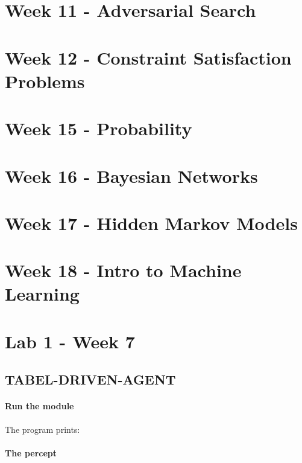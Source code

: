 \documentclass{article}
\begin{document}
\section{Week 11 - Adversarial Search}%
\label{sub:_adversarial_search}


\newpage
\section{Week 12 - Constraint Satisfaction Problems}%
\label{sec:23_march_constraint_satisfaction_problems}



\newpage
\section{Week 15 - Probability}%
\label{sec:12_march_probability}

\newpage
\section{Week 16 - Bayesian Networks}%
\label{sec:20_march_bayesian_networks}

\newpage
\section{Week 17 - Hidden Markov Models}%
\label{sec:27_march_hidden_markov_models}

\newpage
\section{Week 18 - Intro to Machine Learning}%
\label{sec:}

\newpage
\section{Lab 1 - Week 7}%
\label{sec:lab_week_7}

\subsection{TABEL-DRIVEN-AGENT}%
\label{sub:tabel_driven_agent}

\paragraph{Run the module}
The program prints:

\paragraph{The percept }
\end{document}
